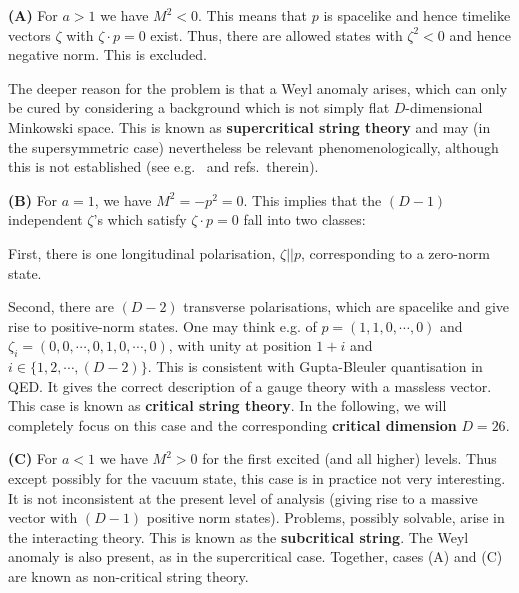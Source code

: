 \documentclass[12pt]{article}
\numberwithin{equation}{section}
\begin{document}
\noindent
{\bf (A)} For $a>1$ we have $M^2<0$. This means that $p$ is spacelike and hence timelike vectors $\zeta$ with $\zeta\cdot p=0$ exist. Thus, there are allowed states with $\zeta^2<0$ and hence negative norm. This is excluded.

The deeper reason for the problem is that a Weyl anomaly arises, which can only be cured by considering a background which is not simply flat $D$-dimensional Minkowski space. This is known as {\bf supercritical string theory} and may (in the supersymmetric case) nevertheless be relevant phenomenologically, although this is not established (see e.g.~\cite{Antoniadis:1988vi, Tseytlin:1991xk, Silverstein:2001xn, Hellerman:2006nx} and refs.~therein). 

\noindent
{\bf (B)} For $a=1$, we have $M^2=-p^2=0$. This implies that the $(D-1)$ independent $\zeta$'s which satisfy $\zeta\cdot p=0$ fall into two classes:

\noindent
First, there is one longitudinal polarisation, $\zeta||p$, corresponding to a zero-norm state.

\noindent
Second, there are $(D-2)$ transverse polarisations, which are spacelike and give rise to positive-norm states. One may think e.g. of $p=(1,1,0,\cdots,0)$ and $\zeta_i=(0,0,\cdots,0,1,0,\cdots,0)$, with unity at position $1+i$ and $i\in\{1,2,\cdots,(D-2)\}$. This is consistent with Gupta-Bleuler quantisation in QED. It gives the correct description of a gauge theory with a massless vector. This case is known as {\bf critical string theory}. In the following, we will completely focus on this case and the corresponding {\bf critical dimension} $D=26$.

{\bf (C)} For $a<1$ we have $M^2>0$ for the first excited (and all higher) levels. Thus except possibly for the vacuum state, this case is in practice not very interesting. It is not inconsistent at the present level of analysis (giving rise to a massive vector with $(D-1)$ positive norm states). Problems, possibly solvable, arise in the interacting theory. This is known as the {\bf subcritical string}. The Weyl anomaly is also present, as in the supercritical case. Together, cases (A) and (C) are known as non-critical string theory. 
\end{document}
